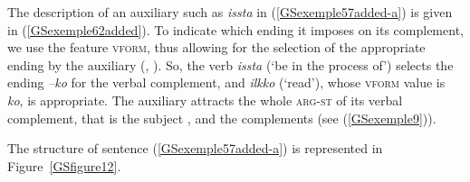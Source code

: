 \documentclass[output=paper
	        ,collection
	        ,collectionchapter
 	        ,biblatex
                ,babelshorthands
                ,newtxmath
                ,draftmode
                ,colorlinks, citecolor=brown
]{langscibook}
\begin{document}
{The description of an auxiliary such as \emph{issta} in (\ref{GSexemple57added-a}) is given in (\ref{GSexemple62added}). To indicate which ending it imposes on its complement, we use the feature \textsc{vform}, thus allowing for the selection of the appropriate ending by the auxiliary (\citealt{Chung98a-u}, \citealt{Kim2016a-u}). So, the verb \emph{issta} (`be in the process of') selects the ending \emph{–ko} for the verbal complement, and \emph{ilkko} (`read'), whose \textsc{vform} value is \emph{ko}, is appropriate. The auxiliary attracts the whole \textsc{arg-st} of its verbal complement, that is the subject , and the complements  (see (\ref{GSexemple9})). 

\begin{exe}
    \label{GSexemple62added}
\end{exe}



The structure of sentence (\ref{GSexemple57added-a}) is represented in Figure~\ref{GSfigure12}.




}
\end{document}
